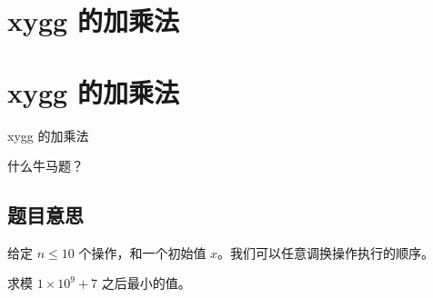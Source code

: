 \def\sectionName{xygg 的加乘法}



\isBeamerMode\relax
    \section[\TOCName]{\sectionName}
\fi
\isBeamerMode\relax
    \section[\TOCName\ -\ \sectionName]{\sectionName}
\fi

\begin{frame}

\isBeamerMode\relax
    {\Huge \sectionName}\par
\fi




什么牛马题？



\end{frame}

\subsection{题目意思}
\begin{frame} %
给定 $n \le 10$ 个操作，和一个初始值 $x$。我们可以任意调换操作执行的顺序。

求模 $1 \times 10 ^ 9 + 7$ 之后最小的值。
\end{frame}



